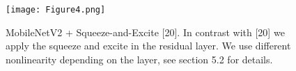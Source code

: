 \begin{figure}[!htbp]
    \centering
    \texttt{[image: Figure4.png]}
    \caption{MobileNetV2 + Squeeze-and-Excite [20]. In contrast with [20] we apply the squeeze and excite in the residual layer.
    We use different nonlinearity depending on the layer, see section 5.2 for details.}
\end{figure}